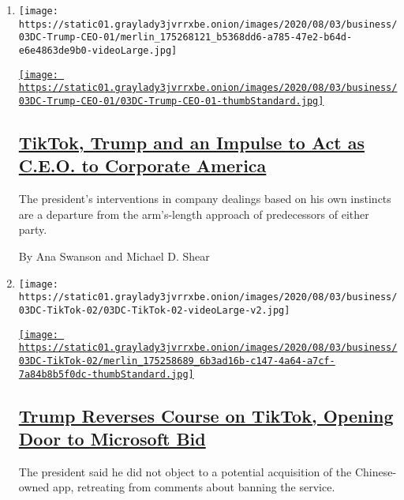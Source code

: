 \begin{enumerate}
\def\labelenumi{\arabic{enumi}.}
\item
  \texttt{[image: https://static01.graylady3jvrrxbe.onion/images/2020/08/03/business/03DC-Trump-CEO-01/merlin\_175268121\_b5368dd6-a785-47e2-b64d-e6e4863de9b0-videoLarge.jpg]}

  \href{/2020/08/03/business/economy/trump-tiktok-china-business.html}{\texttt{[image: https://static01.graylady3jvrrxbe.onion/images/2020/08/03/business/03DC-Trump-CEO-01/03DC-Trump-CEO-01-thumbStandard.jpg]}}

  \hypertarget{tiktok-trump-and-an-impulse-to-act-as-ceo-to-corporate-america}{%
  \subsection{\texorpdfstring{\href{/2020/08/03/business/economy/trump-tiktok-china-business.html}{TikTok,
  Trump and an Impulse to Act as C.E.O. to Corporate
  America}}{TikTok, Trump and an Impulse to Act as C.E.O. to Corporate America}}\label{tiktok-trump-and-an-impulse-to-act-as-ceo-to-corporate-america}}

  The president's interventions in company dealings based on his own
  instincts are a departure from the arm's-length approach of
  predecessors of either party.

  By Ana Swanson and Michael D. Shear
\item
  \texttt{[image: https://static01.graylady3jvrrxbe.onion/images/2020/08/03/business/03DC-TikTok-02/03DC-TikTok-02-videoLarge-v2.jpg]}

  \href{/2020/08/03/technology/trump-tiktok-microsoft.html}{\texttt{[image: https://static01.graylady3jvrrxbe.onion/images/2020/08/03/business/03DC-TikTok-02/merlin\_175258689\_6b3ad16b-c147-4a64-a7cf-7a84b8b5f0dc-thumbStandard.jpg]}}

  \hypertarget{trump-reverses-course-on-tiktok-opening-door-to-microsoft-bid}{%
  \subsection{\texorpdfstring{\href{/2020/08/03/technology/trump-tiktok-microsoft.html}{Trump
  Reverses Course on TikTok, Opening Door to Microsoft
  Bid}}{Trump Reverses Course on TikTok, Opening Door to Microsoft Bid}}\label{trump-reverses-course-on-tiktok-opening-door-to-microsoft-bid}}

  The president said he did not object to a potential acquisition of the
  Chinese-owned app, retreating from comments about banning the service.


\end{enumerate}
